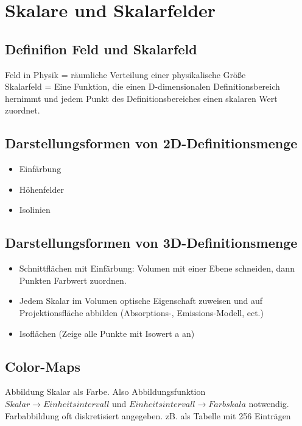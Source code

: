 \documentclass{article}
\begin{document}
\pagebreak

\section{Skalare und Skalarfelder}

\subsection{Definifion Feld und Skalarfeld}
Feld in Physik = räumliche Verteilung einer physikalische  Größe\\
Skalarfeld = Eine Funktion, die einen D-dimensionalen Definitionsbereich hernimmt und jedem Punkt des Definitionsbereiches einen skalaren Wert zuordnet. 

\subsection{Darstellungsformen von 2D-Definitionsmenge}
\begin{itemize}[noitemsep]
	\item Einfärbung
	\item Höhenfelder
	\item Isolinien
\end{itemize}

\subsection{Darstellungsformen von 3D-Definitionsmenge}
\begin{itemize}[noitemsep]
	\item Schnittflächen mit Einfärbung: Volumen mit einer Ebene schneiden, dann Punkten Farbwert zuordnen.
	\item Jedem Skalar im Volumen optische Eigenschaft zuweisen und auf Projektionsfläche abbilden (Absorptions-, Emissions-Modell, ect.)
	\item Isoflächen (Zeige alle Punkte mit Isowert a an)
\end{itemize}

\subsection{Color-Maps}
Abbildung Skalar als Farbe. Also Abbildungsfunktion $Skalar \rightarrow Einheitsintervall$ und $Einheitsintervall \rightarrow Farbskala$ notwendig.\\
Farbabbildung oft diskretisiert angegeben. zB. als Tabelle mit 256 Einträgen\\
\end{document}
